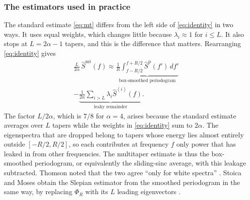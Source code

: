 \documentclass[10pt,twocolumn]{article}
\newcommand{\dd}{\,d}
\begin{document}
\subsubsection{The estimators used in practice}
\label{sec:everyday}
The standard estimate \eqref{eq:mt} differs from the left side of \eqref{eq:identity} in two ways. It uses equal weights, which changes little because $\lambda_i\approx1$ for $i\le L$. It also stops at $L=2\alpha-1$ tapers, and this is the difference that matters. Rearranging \eqref{eq:identity} gives
\begin{multline}
\frac{L}{2\alpha}\,\hat S^{\mathrm{mt}}(f)\approx\underbrace{\frac{1}{R}\int_{f-R/2}^{f+R/2}\hat S^{\mathrm p}(f')\dd f'}_{\text{box-smoothed periodogram}}\\
-\underbrace{\frac{1}{2\alpha}\sum_{i>L}\lambda_i\hat S^{(i)}(f)}_{\text{leaky remainder}} .
\label{eq:corollary}
\end{multline}
The factor $L/2\alpha$, which is $7/8$ for $\alpha=4$, arises because the standard estimate averages over $L$ tapers while the weights in \eqref{eq:identity} sum to $2\alpha$. The eigenspectra that are dropped belong to tapers whose energy lies almost entirely outside $[-R/2,R/2]$, so each contributes at frequency $f$ only power that has leaked in from other frequencies. The multitaper estimate is thus the box-smoothed periodogram, or equivalently the sliding-sinc average, with this leakage subtracted. Thomson noted that the two agree ``only for white spectra'' \cite{thomson1982}. Stoica and Moses obtain the Slepian estimator from the smoothed periodogram in the same way, by replacing $\Phi_R$ with its $L$ leading eigenvectors \cite{stoica2005}.
\end{document}
